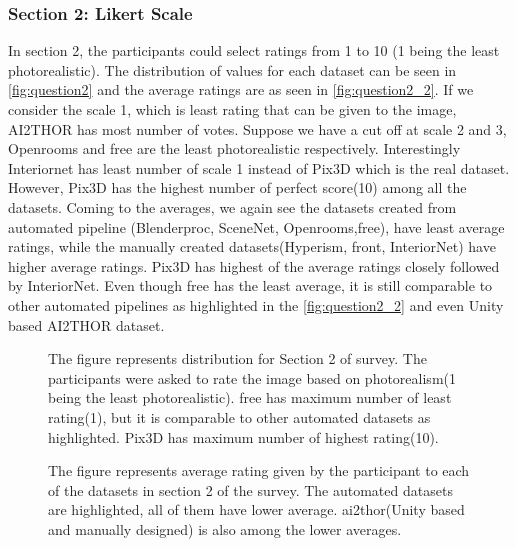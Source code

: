 \subsubsection{Section 2: Likert Scale}
In section 2, the participants could select ratings from 1 to 10 (1 being the least photorealistic).
The distribution of values for each dataset can be seen in \autoref{fig:question2} and the average ratings are as seen in \autoref{fig:question2_2}.
If we consider the scale 1, which is least rating that can be given to the image, AI2THOR has most number of votes.
Suppose we have a cut off at scale 2 and 3, Openrooms and \gls{free} are the least photorealistic respectively.
Interestingly Interiornet has least number of scale 1 instead of Pix3D which is the real dataset.
However, Pix3D has the highest number of perfect score(10) among all the datasets.
Coming to the averages, we again see the datasets created from automated pipeline (Blenderproc, SceneNet, Openrooms,\gls{free}), have least average ratings,
while the manually created datasets(Hyperism, \gls{front}, InteriorNet) have higher average ratings.
Pix3D has highest of the average ratings closely followed by InteriorNet.
Even though \gls{free} has the least average, it is still comparable to other automated pipelines as highlighted in the \autoref{fig:question2_2} and even Unity based AI2THOR dataset.

\begin{figure}
    \centering
    \resizebox{\textwidth}{!}{}
    \caption{The figure represents distribution for Section 2 of survey. The participants were asked to rate the image based on photorealism(1 being the least photorealistic).
    \gls{free} has maximum number of least rating(1), but it is comparable to other automated datasets as highlighted. Pix3D has maximum number of highest rating(10).}
    \label{fig:question2}
\end{figure}

\begin{figure}
    \centering
    \resizebox{\textwidth}{10cm}{}
    \caption{The figure represents average rating given by the participant to each of the datasets in section 2 of the survey.
    The automated datasets are highlighted, all of them have lower average. \gls{ai2thor}(Unity based and manually designed) is also among the lower averages.}
    \label{fig:question2_2}
\end{figure}

